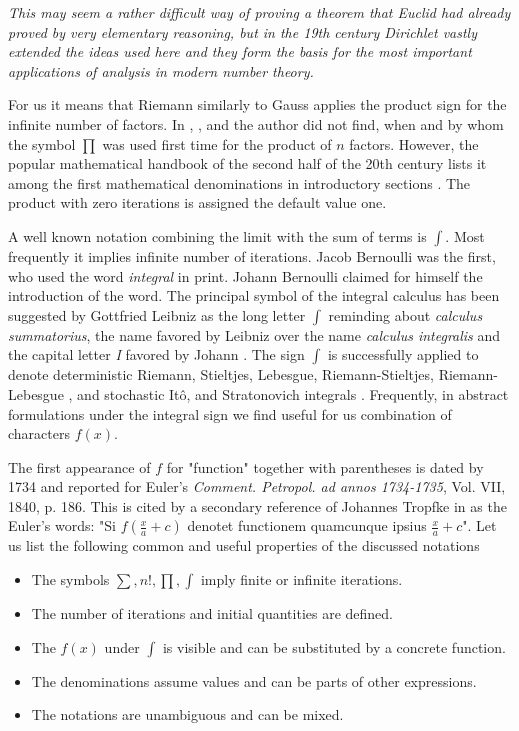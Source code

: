 \documentclass{article}
\begin{document}
\textit{This may seem a rather difficult way of proving a theorem that Euclid had already proved by very elementary reasoning, but in the 19th century Dirichlet vastly extended the ideas used here and they form the basis for the most important applications of analysis in modern number theory.}

For us it means that Riemann similarly to Gauss applies the product sign for the infinite number of factors. In \cite{boyer}, \cite{cajori}, and \cite{yushkevich} the author did not find, when and by whom the symbol $\prod$ was used first time for the product of $n$ factors. However, the popular mathematical handbook of the second half of the 20th century lists it among the first mathematical denominations in introductory sections \cite{korn}. The product with zero iterations is assigned the default value one. 

A well known notation combining the limit with the sum of terms is $\int$. Most frequently it implies infinite number of iterations. Jacob Bernoulli was the first, who used the word \textit{integral} in print. Johann Bernoulli claimed for himself the introduction of the word. The principal symbol of the integral calculus has been suggested by Gottfried Leibniz as the long letter $\int$ reminding about \textit{calculus summatorius}, the name favored by Leibniz over the name \textit{calculus integralis} and the capital letter \textit{I} favored by Johann \cite[item 539, pp. 181 - 182]{cajori}. The sign $\int$ is successfully applied to denote deterministic Riemann, Stieltjes, Lebesgue, Riemann-Stieltjes, Riemann-Lebesgue \cite{korn}, and stochastic It\^{o}, and Stratonovich integrals \cite[p. 48, p. 106]{rogers}. Frequently, in abstract formulations under the integral sign we find useful for us combination of characters $f(x)$.

The first appearance of $f$ for "function" together with parentheses is dated by 1734 and reported for Euler's \textit{Comment. Petropol. ad annos 1734-1735}, Vol. VII, 1840, p. 186. This is cited by a secondary reference of Johannes Tropfke in \cite[item 643, p. 268]{cajori} as the Euler's words: "Si $f(\frac{x}{a}+c)$ denotet functionem quamcunque ipsius $\frac{x}{a}+c$". Let us list the following common and useful properties of the discussed notations

\begin{itemize}
\item The symbols $\sum, n!, \prod, \int$ imply finite or infinite iterations.
\item The number of iterations and initial quantities are defined.
\item The $f(x)$ under $\int$ is visible and can be substituted by a concrete function.
\item The denominations assume values and can be parts of other expressions.
\item The notations are unambiguous and can be mixed.
\end{itemize}
\end{document}
